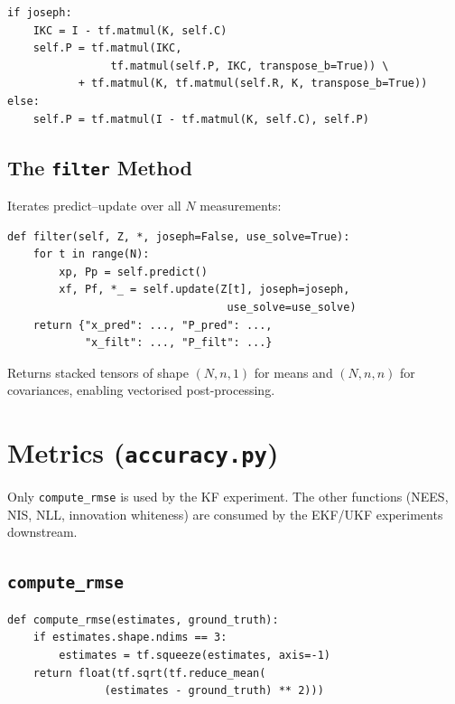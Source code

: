\documentclass[11pt,a4paper]{article}
\newcommand{\py}[1]{\lstinline[style=py]{#1}}
\newcommand{\file}[1]{\texttt{#1}}
\begin{document}
\begin{lstlisting}[caption={Joseph form implementation.}]
if joseph:
    IKC = I - tf.matmul(K, self.C)
    self.P = tf.matmul(IKC,
                tf.matmul(self.P, IKC, transpose_b=True)) \
           + tf.matmul(K, tf.matmul(self.R, K, transpose_b=True))
else:
    self.P = tf.matmul(I - tf.matmul(K, self.C), self.P)
\end{lstlisting}

\subsection{The \py{filter} Method}

Iterates predict--update over all $N$ measurements:

\begin{lstlisting}[caption={Full filtering loop.}]
def filter(self, Z, *, joseph=False, use_solve=True):
    for t in range(N):
        xp, Pp = self.predict()
        xf, Pf, *_ = self.update(Z[t], joseph=joseph,
                                  use_solve=use_solve)
    return {"x_pred": ..., "P_pred": ...,
            "x_filt": ..., "P_filt": ...}
\end{lstlisting}

Returns stacked tensors of shape $(N, n, 1)$ for means and
$(N, n, n)$ for covariances, enabling vectorised post-processing.


\section{Metrics (\file{accuracy.py})}

Only \py{compute_rmse} is used by the KF experiment.  The other
functions (NEES, NIS, NLL, innovation whiteness) are consumed by the
EKF/UKF experiments downstream.

\subsection{\py{compute_rmse}}

\begin{lstlisting}[caption={RMSE implementation.}]
def compute_rmse(estimates, ground_truth):
    if estimates.shape.ndims == 3:
        estimates = tf.squeeze(estimates, axis=-1)
    return float(tf.sqrt(tf.reduce_mean(
               (estimates - ground_truth) ** 2)))
\end{lstlisting}
\end{document}
